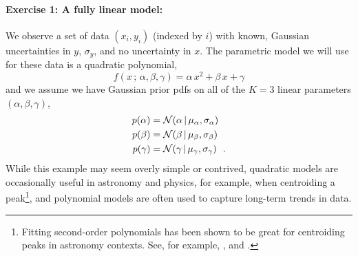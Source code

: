 \paragraph{Exercise 1: A fully linear model:} We observe
a set of data $(x_i, y_i)$ (indexed by $i$) with
known, Gaussian uncertainties in $y$, $\sigma_y$, and no uncertainty in $x$.
The parametric model we will use for these data is a quadratic polynomial,
\begin{equation}
  f(x \,;\, \alpha, \beta, \gamma) = \alpha\,x^2 + \beta\,x + \gamma
\end{equation}
and we assume we have Gaussian prior pdfs on all of the $K=3$ linear parameters
$(\alpha, \beta, \gamma)$,
\begin{align}
  p(\alpha) &= \mathcal{N}\!\,(\alpha \,|\, \mu_\alpha, \sigma_\alpha)\\
  p(\beta) &= \mathcal{N}\!\,(\beta \,|\, \mu_\beta, \sigma_\beta)\\
  p(\gamma) &= \mathcal{N}\!\,(\gamma \,|\, \mu_\gamma, \sigma_\gamma)
  ~~.
\end{align}
While this example may seem overly simple or contrived, quadratic models are
occasionally useful in astronomy and physics, for example, when centroiding a
peak\footnote{Fitting second-order polynomials has been shown to be great for
  centroiding peaks in astronomy contexts. See, for example, \cite{vakili}, and
  \cite{teague}.},
and polynomial models are often used to capture long-term trends in data.

